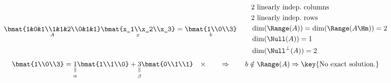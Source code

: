 \begin{example}
\[
\underset{A}{\bmat{1&0&1\\1&1&2\\0&1&1}}\underset{x}{\bmat{x_1\\x_2\\x_3}}=\underset{b}{\bmat{1\\0\\3}}
\qquad
\begin{aligned}
&2\text{ linearly indep.\ columns}\\
&2\text{ linearly indep.\ rows}\\
&\dim(\Range(A))=\dim(\Range(A\Hm))=2\\
&\dim(\Null(A))=1\\
&\dim(\Null^\perp(A))=2
\end{aligned}
\]
\[
\bmat{1\\0\\3}=\underset{\alpha}{\underset{\parallel}{1}}\bmat{1\\1\\0}+\underset{\beta}{\underset{\parallel}{3}}\bmat{0\\1\\1}\quad\times
\qquad\Rightarrow\qquad b\notin\Range(A)\Rightarrow\text{\key{No exact solution.}}
\]


\end{example}
